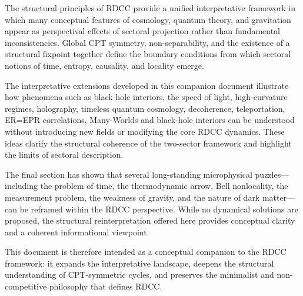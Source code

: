 \documentclass[11pt,a4paper]{article}
\begin{document}
The structural principles of RDCC provide a unified interpretative framework in which many conceptual features of cosmology, quantum theory, and gravitation appear as perspectival effects of sectoral projection rather than fundamental inconsistencies. Global CPT symmetry, non-separability, and the existence of a structural fixpoint together define the boundary conditions from which sectoral notions of time, entropy, causality, and locality emerge.

The interpretative extensions developed in this companion document illustrate how phenomena such as black hole interiors, the speed of light, high-curvature regimes, holography, timeless quantum cosmology, decoherence, teleportation, ER=EPR correlations, Many-Worlds and black-hole interiors can be understood without introducing new fields or modifying the core RDCC dynamics. These ideas clarify the structural coherence of the two-sector framework and highlight the limits of sectoral description.

The final section has shown that several long-standing microphysical puzzles—including the problem of time, the thermodynamic arrow, Bell nonlocality, the measurement problem, the weakness of gravity, and the nature of dark matter—can be reframed within the RDCC perspective. While no dynamical solutions are proposed, the structural reinterpretation offered here provides conceptual clarity and a coherent informational viewpoint.

This document is therefore intended as a conceptual companion to the RDCC framework: it expands the interpretative landscape, deepens the structural understanding of CPT-symmetric cycles, and preserves the minimalist and non-competitive philosophy that defines RDCC.


\nocite{*}

\end{document}
